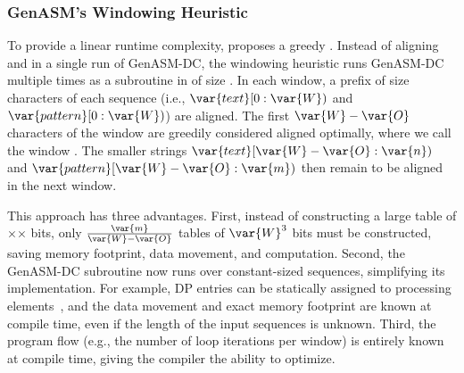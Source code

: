 \subsubsection{GenASM's Windowing Heuristic} \label{sec:windowing}


To provide a linear runtime complexity, \citep{cali2020genasm} proposes a greedy . Instead of aligning  and  in a single run of GenASM-DC, the windowing heuristic runs GenASM-DC multiple times as a subroutine in  of size . In each window, a prefix of size  characters of each sequence (i.e., $\var{text}[0:\var{W})$ and $\var{pattern}[0:\var{W})$) are aligned. The first $\var{W} - \var{O}$ characters of the window are greedily considered aligned optimally, where we call  the window . The smaller strings $\var{text}[\var{W}-\var{O}:\var{n})$ and $\var{pattern}[\var{W}-\var{O}:\var{m})$ then remain to be aligned in the next window.

This approach has three advantages. First, instead of constructing a large table of $\times$$\times$ bits, only $\frac{\var{m}}{\var{W} - \var{O}}$ tables of $\var{W}^3$ bits must be constructed, saving memory footprint, data movement, and computation. Second, the GenASM-DC subroutine now runs over constant-sized sequences, simplifying its implementation. For example, DP entries can be statically assigned to processing elements~\citep{cali2020genasm}, and the data movement and exact memory footprint are known at compile time, even if the length of the input sequences is unknown. Third, the program flow (e.g., the number of loop iterations per window) is entirely known at compile time, giving the compiler the ability to optimize.

